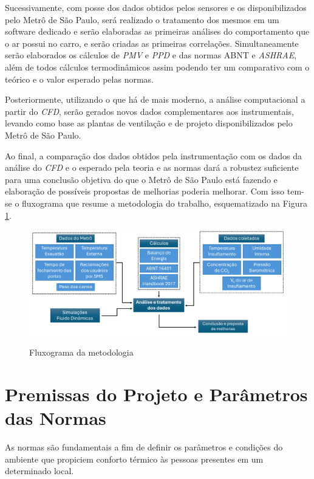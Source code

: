 \documentclass[acronym,symbols,table]{fei}
\begin{document}
Sucessivamente, com posse dos dados obtidos pelos sensores e os disponibilizados pelo Metrô de São Paulo, será realizado o tratamento dos mesmos em um software dedicado e serão elaboradas as primeiras análises do comportamento que o ar possui no carro, e serão criadas as primeiras correlações. Simultaneamente serão elaborados os cálculos de \textit{PMV} e \textit{PPD} e das normas ABNT e \textit{ASHRAE}, além de todos cálculos termodinâmicos assim podendo ter um comparativo com o teórico e o valor esperado pelas normas.

Posteriormente, utilizando o que há de mais moderno, a análise computacional a partir do \textit{CFD}, serão gerados novos dados complementares aos instrumentais, levando como base as plantas de ventilação e de projeto disponibilizados pelo Metrô de São Paulo.

Ao final, a comparação dos dados obtidos pela instrumentação com os dados da análise do \textit{CFD} e o esperado pela teoria e as normas dará a robustez suficiente para uma conclusão objetiva do que o Metrô de São Paulo está fazendo e elaboração de possíveis propostas de melhorias poderia melhorar. Com isso tem-se o fluxograma que resume a metodologia do trabalho, esquematizado na Figura \ref{fig: Fluxograma}.

\begin{figure}[!htb] 
 \centering
    \caption{Fluxograma da metodologia}
    \includegraphics[width=1\linewidth]{Imagens/Fluxograma_da_metodologia.png}
    \label{fig: Fluxograma}
\end{figure}


\section{Premissas do Projeto e Parâmetros das Normas} \label{premissas}

As normas são fundamentais a fim de definir os parâmetros e condições do ambiente que propiciem conforto térmico às pessoas presentes em um determinado local.
\end{document}
